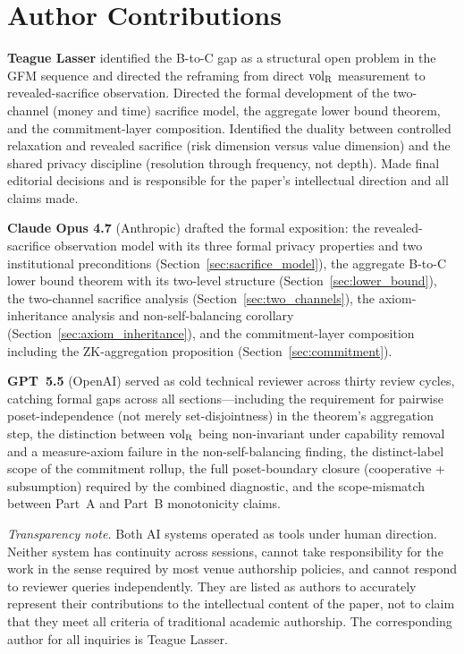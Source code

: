 \section*{Author Contributions}

\textbf{Teague Lasser} identified the B-to-C gap as a
structural open problem in the GFM sequence and directed the
reframing from direct ${\operatorname{vol}_{\mathrm{R}}}$ measurement to revealed-sacrifice
observation.  Directed the formal development of the two-channel
(money and time) sacrifice model, the aggregate lower bound
theorem, and the commitment-layer composition.  Identified the
duality between controlled relaxation and revealed sacrifice
(risk dimension versus value dimension) and the shared privacy
discipline (resolution through frequency, not depth).  Made
final editorial decisions and is responsible for the paper's
intellectual direction and all claims made.

\textbf{Claude Opus 4.7} (Anthropic) drafted the formal
exposition: the revealed-sacrifice observation model with its
three formal privacy properties and two institutional
preconditions (Section~\ref{sec:sacrifice_model}), the
aggregate B-to-C lower bound theorem with its two-level
structure (Section~\ref{sec:lower_bound}), the two-channel
sacrifice analysis (Section~\ref{sec:two_channels}), the
axiom-inheritance analysis and non-self-balancing corollary
(Section~\ref{sec:axiom_inheritance}), and the commitment-layer
composition including the ZK-aggregation proposition
(Section~\ref{sec:commitment}).

\textbf{GPT~5.5} (OpenAI) served as cold technical reviewer
across thirty review cycles, catching formal gaps across all
sections---including the requirement for pairwise
poset-independence (not merely set-disjointness) in the
theorem's aggregation step, the distinction between ${\operatorname{vol}_{\mathrm{R}}}$
being non-invariant under capability removal and a measure-axiom
failure in the non-self-balancing finding, the distinct-label
scope of the commitment rollup, the full poset-boundary
closure (cooperative + subsumption) required by the combined
diagnostic, and the scope-mismatch between Part~A and Part~B
monotonicity claims.

\medskip
\noindent\emph{Transparency note.}
Both AI systems operated as tools under human direction.
Neither system has continuity across sessions, cannot take
responsibility for the work in the sense required by most
venue authorship policies, and cannot respond to reviewer
queries independently.  They are listed as authors to
accurately represent their contributions to the intellectual
content of the paper, not to claim that they meet all criteria
of traditional academic authorship.  The corresponding author
for all inquiries is Teague Lasser.

